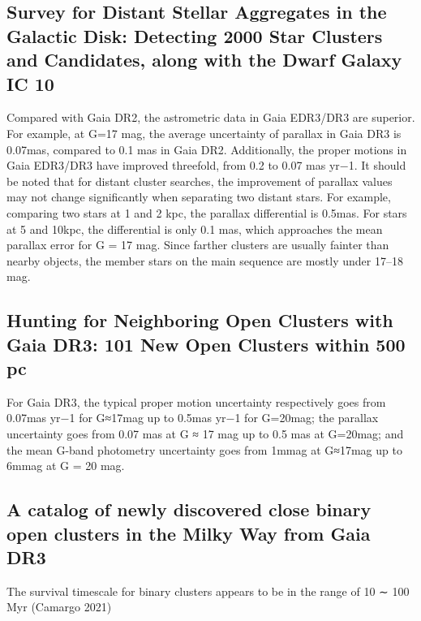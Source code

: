\documentclass[../main.tex]{subfiles}
\begin{document}
{\subsection{Survey for Distant Stellar Aggregates in the Galactic Disk: Detecting 2000 Star Clusters and Candidates, along with the Dwarf Galaxy IC 10} %
Compared with Gaia DR2, the astrometric data in Gaia EDR3/DR3 are superior. For example, at G=17 mag, the average uncertainty of parallax in Gaia DR3 is 0.07mas, compared to 0.1 mas in Gaia DR2. Additionally, the proper motions in Gaia EDR3/DR3 have improved threefold, from 0.2 to 0.07 mas yr−1. It should be noted that for distant cluster searches, the improvement of parallax values may not change significantly when separating two distant stars. For example, comparing two stars at 1 and 2 kpc, the parallax differential is 0.5mas. For stars at 5 and 10kpc, the differential is only 0.1 mas, which approaches the mean parallax error for G = 17 mag. Since farther clusters are usually fainter than nearby objects, the member stars on the main sequence are mostly under 17–18 mag.
\subsection{Hunting for Neighboring Open Clusters with Gaia DR3: 101 New Open Clusters within 500 pc} %
For Gaia DR3, the typical proper motion uncertainty respectively goes from 0.07mas yr−1 for G≈17mag up to 0.5mas yr−1 for G=20mag; the parallax uncertainty goes from 0.07 mas at G ≈ 17 mag up to 0.5 mas at G=20mag; and the mean G-band photometry uncertainty goes from 1mmag at G≈17mag up to 6mmag at G = 20 mag.

\subsection{A catalog of newly discovered close binary open clusters in the Milky Way from Gaia DR3} %
The survival timescale for binary clusters appears to be in the range of 10 ∼ 100 Myr (Camargo 2021)


}
\end{document}
